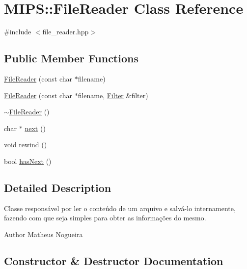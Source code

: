 \hypertarget{classMIPS_1_1FileReader}{}\section{M\+I\+PS\+:\+:File\+Reader Class Reference}
\label{classMIPS_1_1FileReader}


{\ttfamily \#include $<$file\+\_\+reader.\+hpp$>$}

\subsection*{Public Member Functions}
\begin{DoxyCompactItemize}
\item 
\hyperlink{classMIPS_1_1FileReader_ab3287e189c99bc1c6232e0a874824a04}{File\+Reader} (const char $\ast$filename)
\item 
\hyperlink{classMIPS_1_1FileReader_a9151c88a7f99aeddb7f2114b1263ccda}{File\+Reader} (const char $\ast$filename, \hyperlink{classMIPS_1_1Filter}{Filter} \&filter)
\item 
\hyperlink{classMIPS_1_1FileReader_a2357f2ae095cb728bfccf5d3b72529a8}{$\sim$\+File\+Reader} ()
\item 
char $\ast$ \hyperlink{classMIPS_1_1FileReader_af343e2652200f0ae52cedbfe22dba0cf}{next} ()
\item 
void \hyperlink{classMIPS_1_1FileReader_a5f60a3cdab4475ddf28bb3cc77a742ad}{rewind} ()
\item 
bool \hyperlink{classMIPS_1_1FileReader_a15e77fbddc428aaab28d750bdd777479}{has\+Next} ()
\end{DoxyCompactItemize}


\subsection{Detailed Description}
Classe responsável por ler o conteúdo de um arquivo e salvá-\/lo internamente, fazendo com que seja simples para obter as informações do mesmo.

\begin{DoxyAuthor}{Author}
Matheus Nogueira 
\end{DoxyAuthor}


\subsection{Constructor \& Destructor Documentation}
